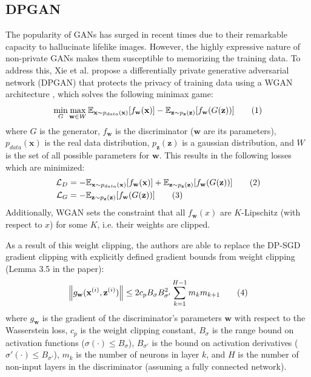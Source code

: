 \documentclass{article}
\begin{document}
\newcommand{\ww}{\textbf{w}}
\newcommand{\xx}{\textbf{x}}
\newcommand{\xxh}{\hat{\textbf{x}}}
\newcommand{\zz}{\textbf{z}}

\subsection{DPGAN}

The popularity of GANs has surged in recent times due to their remarkable capacity to hallucinate lifelike images. However, the highly expressive nature of non-private GANs makes them susceptible to memorizing the training data. To address this, Xie et al. propose a differentially private generative adversarial network (DPGAN) \cite{dpgan} that protects the privacy of training data using a WGAN architecture \cite{wgan}, which solves the following minimax game:
\[
    \min_{G} \max_{\ww \in W} \EE_{\xx \sim p_{data}(\xx)} [f_\ww (\xx)] - \EE_{\zz \sim p_{\zz} (\zz)} [f_\ww (G(\zz))]
    \tag{1}
\]
where $G$ is the generator, $f_\ww$ is the discriminator ($\ww$ are its parameters), $p_{data}(\xx)$ is the real data distribution, $p_{\zz} (\zz)$ is a gaussian distribution, and $W$ is the set of all possible parameters for $\ww$. 
This results in the following losses which are minimized:
\begin{align*}
    \mathcal{L}_D &= -\EE_{\xx \sim p_{data}(\xx)} [f_\ww (\xx)] + \EE_{\zz \sim p_{\zz} (\zz)} [f_\ww (G(\zz))]
    \tag{2}
    \\
    \mathcal{L}_G &= -\EE_{\zz \sim p_{\zz} (\zz)} [f_\ww (G(\zz))] 
    \tag{3}
\end{align*}
Additionally, WGAN sets the constraint that all $f_\ww(x)$ are $K$-Lipschitz (with respect to $x$) for some $K$, i.e. their weights are clipped.

As a result of this weight clipping, the authors are able to replace the DP-SGD gradient clipping with explicitly defined gradient bounds from weight clipping (Lemma 3.5 in the paper):
\[
    \norm{g_\ww (\xx^{(i)}, \zz^{(i)})} \leq 2 c_p B_\sigma B_{\sigma'}^2 \sum_{k=1}^{H-1} m_k m_{k+1} 
    \tag{4}
\]
where $g_\ww$ is the gradient of the discriminator's parameters $\ww$ with respect to the Wasserstein loss, $c_p$ is the weight clipping constant, $B_\sigma$ is the range bound on activation functions ($\sigma(\cdot) \leq B_\sigma$), $B_{\sigma'}$ is the bound on activation derivatives ($\sigma'(\cdot) \leq B_{\sigma'}$), $m_k$ is the number of neurons in layer $k$, and $H$ is the number of non-input layers in the discriminator (assuming a fully connected network).
\end{document}
